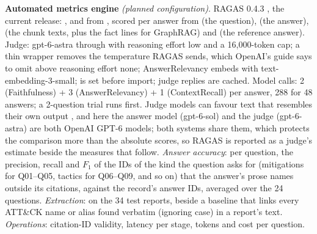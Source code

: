 \documentclass[10pt]{article}
\begin{document}
\textbf{Automated metrics engine} \emph{(planned configuration)}. RAGAS 0.4.3 \cite{7}, the current release: ,  and  from , scored per answer from  (the question),  (the answer),  (the chunk texts, plus the fact lines for GraphRAG) and  (the reference answer). Judge: gpt-6-astra through  with reasoning effort low and a 16,000-token cap; a thin wrapper removes the temperature RAGAS sends, which OpenAI's guide says to omit above reasoning effort none; AnswerRelevancy embeds with text-embedding-3-small;  is set before import; judge replies are cached. Model calls: 2 (Faithfulness) + 3 (AnswerRelevancy) + 1 (ContextRecall) per answer, 288 for 48 answers; a 2-question trial runs first. Judge models can favour text that resembles their own output \cite{8,9,10}, and here the answer model (gpt-6-sol) and the judge (gpt-6-astra) are both OpenAI GPT-6 models; both systems share them, which protects the comparison more than the absolute scores, so RAGAS is reported as a judge's estimate beside the measures that follow. \emph{Answer accuracy}: per question, the precision, recall and $F_1$ of the IDs of the kind the question asks for (mitigations for Q01--Q05, tactics for Q06--Q09, and so on) that the answer's prose names outside its citations, against the record's answer IDs, averaged over the 24 questions. \emph{Extraction}:  on the 34 test reports, beside a baseline that links every ATT\&CK name or alias found verbatim (ignoring case) in a report's text. \emph{Operations}: citation-ID validity, latency per stage, tokens and cost per question.
\end{document}
